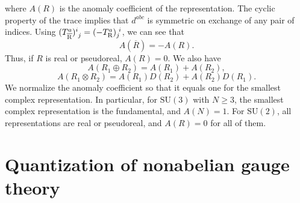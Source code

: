 where $A(R)$ is the anomaly coefficient of the representation. The cyclic property of the trace implies that $d^{abc}$ is symmetric on exchange of any pair of indices. Using $(T^{a}_{\rm \overline{R}})^{i}_{\phantom{i}j} = (-T^{a}_{\rm R})_{j}^{\phantom{i}i}$, we can see that
\[A(\overline{R}) = -A(R).\]
Thus, if $R$ is real or pseudoreal, $A(R) = 0$. We also have
\[A(R_1\oplus R_2) = A(R_1) + A(R_2),\]
\[A(R_1\otimes R_2) = A(R_1)D(R_2) + A(R_2)D(R_1).\]
We normalize the anomaly coefficient so that it equals one for the smallest complex representation. In particular, for $\mathrm{SU}(3)$ with $N \geq 3$, the smallest complex representation is the fundamental, and $A(N) = 1$. For $\mathrm{SU}(2)$, all representations are real or pseudoreal, and $A(R) = 0$ for all of them.

\section{Quantization of nonabelian gauge theory}
